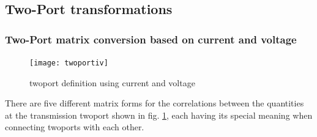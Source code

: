 \subsection{Two-Port transformations}

\subsubsection{Two-Port matrix conversion based on current and voltage}

\begin{figure}[ht]
\begin{center}
\texttt{[image: twoportiv]}
\end{center}
\caption{twoport definition using current and voltage}
\label{fig:twoportiv}
\end{figure}
\FloatBarrier

There are five different matrix forms for the correlations between the
quantities at the transmission twoport shown in
fig. \ref{fig:twoportiv}, each having its special meaning when
connecting twoports with each other.

